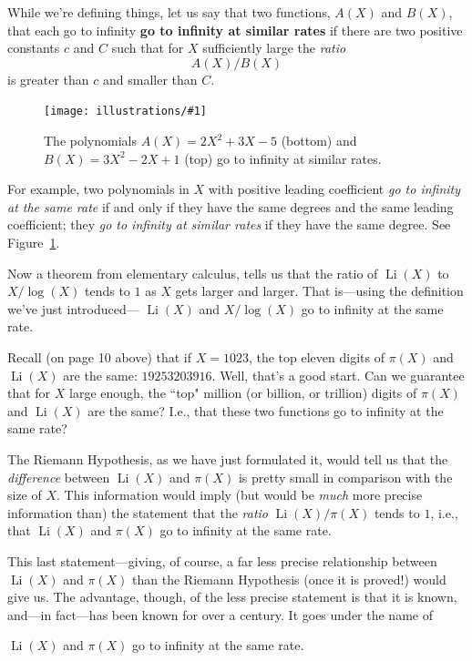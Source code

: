 \documentclass[11pt]{article}
\DeclareMathOperator{\Li}{Li}
\newcommand{\ill}[3]{ 
   \begin{figure}[H]
   \begin{center}
   \texttt{[image: illustrations/\#1]}
   \caption{#3}
   \end{center}
    \end{figure}
}
\theoremstyle{plain}
\theoremstyle{definition}
\numberwithin{equation}{section}
\numberwithin{figure}{section}
\numberwithin{table}{section}
\begin{document}
While we're defining things, let us say that two functions, $A(X)$
and $B(X)$, that each go to infinity {\bf go to infinity at
similar rates} if there are two positive constants $c$ and $C$
such that for $X$ sufficiently large the {\it ratio}
$$
      A(X)/B(X)
$$
is greater than $c$ and smaller than $C$.  

    \ill{similar_rates}{1.0}{The polynomials $A(X)=2 X^{2} + 3 X - 5$ (bottom)
and $B(X)=  3 X^{2} - 2 X + 1$ (top) go to infinity at similar rates.\label{fig:simrates}}



For example, two polynomials in $X$ with positive leading coefficient
{\it go to infinity at the same rate} if and only if they have the
same degrees and the same leading coefficient; they {\it go to
  infinity at similar rates} if they have the same degree.
See Figure~\ref{fig:simrates}. %

    


Now a theorem from elementary calculus, tells us that the ratio of
$\Li(X)$ to $X/\log(X)$ tends to $1$ as $X$ gets larger and larger.
That is---using the definition we've just introduced--- $\Li(X)$ and
$X/\log(X)$ go to infinity at the same rate.


Recall (on page 10 above)  that
if $X = 1023$, the top eleven digits of $\pi(X)$ and $\Li(X)$ are the same: $19253203916.$ Well, that's a good start. Can we guarantee that for  $X$ large enough, the ``top" million (or billion, or trillion) digits of $\pi(X)$ and $\Li(X)$ are the same? I.e., that these two functions go to infinity at the same rate?
  
The Riemann Hypothesis, as we have just formulated it, would tell us
that the {\it difference} between $\Li(X)$ and $\pi(X)$ is pretty small
in comparison with the size of $X$. This information would imply (but
would be {\it much} more precise information than) the statement that
the {\it ratio} $\Li(X)/\pi(X)$ tends to $1$, i.e., that $\Li(X)$ and
$\pi(X)$ go to infinity at the same rate.

This last statement---giving, of course, a far less precise
relationship between $\Li(X)$ and $\pi(X)$ than the Riemann Hypothesis
(once it is proved!) would give us.  The advantage, though, of the
less precise statement is that it is known, and---in fact---has been
known for over a century. It goes under the name of
  
\vskip10pt
  $\Li(X)$ and $\pi(X)$ go to infinity at the same rate.
   \vskip10pt
\end{document}
